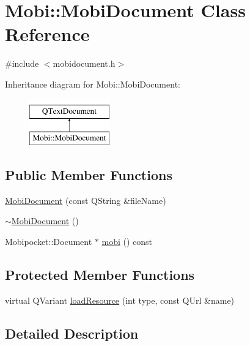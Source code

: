 \hypertarget{classMobi_1_1MobiDocument}{\section{Mobi\+:\+:Mobi\+Document Class Reference}
\label{classMobi_1_1MobiDocument}
}


{\ttfamily \#include $<$mobidocument.\+h$>$}

Inheritance diagram for Mobi\+:\+:Mobi\+Document\+:\begin{figure}[H]
\begin{center}
\leavevmode
\includegraphics[height=2.000000cm]{classMobi_1_1MobiDocument}
\end{center}
\end{figure}
\subsection*{Public Member Functions}
\begin{DoxyCompactItemize}
\item 
\hyperlink{classMobi_1_1MobiDocument_a3b77261b1552383dd533f49fc72a21e2}{Mobi\+Document} (const Q\+String \&file\+Name)
\item 
\hyperlink{classMobi_1_1MobiDocument_a92fbc8d691471043e6733bb5faad99ad}{$\sim$\+Mobi\+Document} ()
\item 
Mobipocket\+::\+Document $\ast$ \hyperlink{classMobi_1_1MobiDocument_a22ca18d34e4e1f9f3aacf54ed7d274c8}{mobi} () const 
\end{DoxyCompactItemize}
\subsection*{Protected Member Functions}
\begin{DoxyCompactItemize}
\item 
virtual Q\+Variant \hyperlink{classMobi_1_1MobiDocument_a35ad9b759c528d3de5b590754ca7774d}{load\+Resource} (int type, const Q\+Url \&name)
\end{DoxyCompactItemize}


\subsection{Detailed Description}


